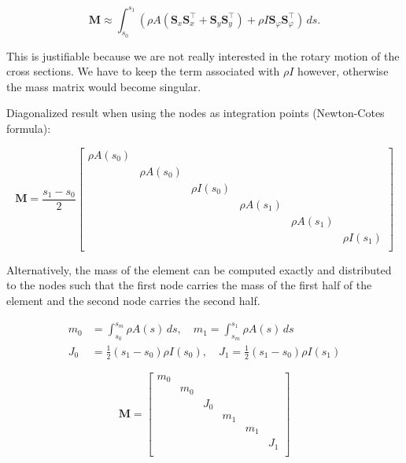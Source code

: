 \begin{equation}
\boldsymbol{M} \approx \int_{s_0}^{s_1} \left(\rho A\left(\boldsymbol{S}_x\boldsymbol{S}_x^\intercal + \boldsymbol{S}_y\boldsymbol{S}_y^\intercal\right) + \rho I\boldsymbol{S}_\varphi\boldsymbol{S}_\varphi^\intercal\right)\,ds.
\end{equation}

This is justifiable because we are not really interested in the rotary motion of the cross sections.
We have to keep the term associated with $\rho I$ however, otherwise the mass matrix would become singular.

Diagonalized result when using the nodes as integration points (Newton-Cotes formula):

\begin{equation}
\boldsymbol{M} = \frac{s_1- s_0}{2}\begin{bmatrix}
\rho A(s_0) \\
& \rho A(s_0) \\
& & \rho I(s_0) \\
& & & \rho A(s_1) \\
& & & & \rho A(s_1) \\
& & & & & \rho I(s_1) \\
\end{bmatrix}
\end{equation}

Alternatively, the mass of the element can be computed exactly and distributed to the nodes such that the first node carries the mass of the first half of the element and the second node carries the second half.


\begin{align}
m_{0} &= \int_{s_0}^{s_m} \rho A(s)\,ds, \quad m_{1} = \int_{s_m}^{s_1} \rho A(s)\,ds \\
J_{0} &= \frac{1}{2}(s_1- s_0)\rho I(s_0), \quad J_{1} = \frac{1}{2}(s_1- s_0)\rho I(s_1)
\end{align}

\begin{equation}
\boldsymbol{M} = \begin{bmatrix}
m_0 \\
& m_0 \\
& & J_0 \\
& & & m_1 \\
& & & & m_1 \\
& & & & & J_1 \\
\end{bmatrix}
\end{equation}


